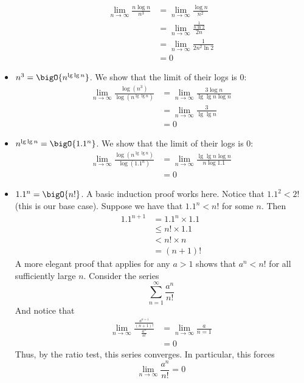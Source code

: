 \documentclass[final]{article}
\begin{document}
\begin{solution}
\begin{itemize}
              \begin{align*}\lim_{n \to \infty}\frac{n\log{n}}{n^3}
                   & = \lim_{n \to \infty}\frac{\log{n}}{n^2}          \\
                   & = \lim_{n \to \infty}\frac{\frac{1}{n\ln{2}}}{2n} \\
                   & = \lim_{n \to \infty}\frac{1}{2n^2\ln2}           \\
                   & = 0
              \end{align*}
        \item \(n^3 = \bigO{n^{\lg\lg{n}}}\). We show that the limit of their logs is 0:
              \begin{align*}\lim_{n\to\infty}\frac{\log\left(n^3\right)}{\log\left(n^{\lg\lg{n}}\right)}
                   & = \lim_{n \to \infty}\frac{3\log{n}}{\lg\lg{n}\log{n}} \\
                   & = \lim_{n \to \infty}\frac{3}{\lg\lg{n}}               \\
                   & = 0
              \end{align*}
        \item \(n^{\lg\lg{n}} = \bigO{1.1^n}\). We show that the limit of their logs is 0:
              \begin{align*}\lim_{n\to\infty}\frac{\log\left(n^{\lg\lg{n}}\right)}{\log\left(1.1^n\right)}
                   & = \lim_{n \to \infty}\frac{\lg\lg{n}\log{n}}{n\log{1.1}} \\
                   & = 0
              \end{align*}
        \item \(1.1^n = \bigO{n!}\). A basic induction proof works here. Notice that \(1.1^2 < 2!\) (this is our base case). Suppose we have that \(1.1^n < n!\) for some \(n\). Then
              \begin{align*}1.1^{n + 1}
                   & = 1.1^n \times 1.1 \\
                   & \leq n! \times 1.1 \\
                   & < n! \times n      \\
                   & = (n + 1)!
              \end{align*}
              A more elegant proof that applies for any \(a > 1\) shows that \(a^n < n!\) for all sufficiently large \(n\). Consider the series \[\sum_{n=1}^{\infty}\frac{a^n}{n!}\] And notice that
              \begin{align*}\lim_{n \to \infty}\frac{\frac{a^{n + 1}}{(n + 1)!}}{\frac{a^n}{n!}}
                   & = \lim_{n \to \infty}\frac{a}{n = 1} \\
                   & = 0
              \end{align*} Thus, by the ratio test, this series converges. In particular, this forces \[\lim_{n \to \infty}\frac{a^n}{n!} = 0\]
    \end{itemize}
\end{solution}
\end{document}
